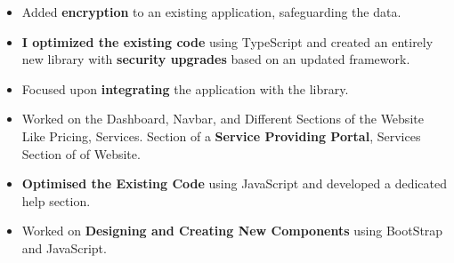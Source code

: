 \documentclass[10pt,a4paper,ragged2e]{altacv}
\begin{document}

\begin{fullwidth}
\makecvheader
\end{fullwidth}



\begin{itemize}
\item Added \textbf{encryption} to an existing application, safeguarding the data.
\smallskip
\item \textbf {I optimized the existing code} using TypeScript and created an entirely new library with \textbf{security upgrades} based on an updated framework.
\smallskip
\item Focused upon \textbf{integrating} the application with the library.
\end{itemize}
\smallskip

\begin{itemize}
\item Worked on the Dashboard, Navbar, and Different Sections of the Website Like Pricing, Services.
Section of a \textbf{Service Providing Portal}, Services Section of \textbf{} of Website.
\smallskip
\item \textbf{Optimised the Existing Code} using JavaScript and developed a dedicated help section.
\smallskip
\item Worked on \textbf{Designing and Creating New Components} using BootStrap and JavaScript.
\end{itemize}
\smallskip
\end{document}
